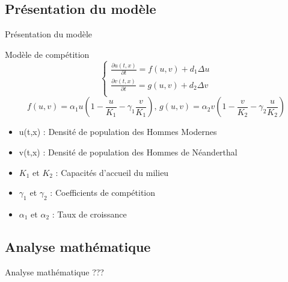 \documentclass[10pt]{beamer}
\begin{document}
\subsection{Présentation du modèle}
\begin{frame}{Présentation du modèle}{}
\begin{block}{Modèle de compétition}
	$$\begin{cases} \frac{\partial u(t,x)}{\partial t} = f(u,v) + d_1\Delta u\\ \frac{\partial v(t,x)}{\partial t} = g(u,v) + d_2 \Delta v \\ 
\end{cases}$$
	$$f(u,v) = \alpha_1 u\left(1-\frac{u}{K_1}-\gamma_1\frac{v}{K_1}\right) \text{, } g(u,v) = \alpha_2 v\left(1-\frac{v}{K_2}-\gamma_2\frac{u}{K_2}\right)$$
\end{block}
\begin{itemize}
	\item u(t,x) : Densité de population des Hommes Modernes 
    \item v(t,x) : Densité de population des Hommes de Néanderthal 
    \item $K_1$ et $K_2$ : Capacités d'accueil du milieu
    \item $\gamma_1$ et $\gamma_2$ : Coefficients de compétition
    \item $\alpha_1$ et $\alpha_2$ : Taux de croissance
\end{itemize}
\end{frame}

\subsection{Analyse mathématique}
\begin{frame}{Analyse mathématique}{}
???
\end{frame}
\end{document}
